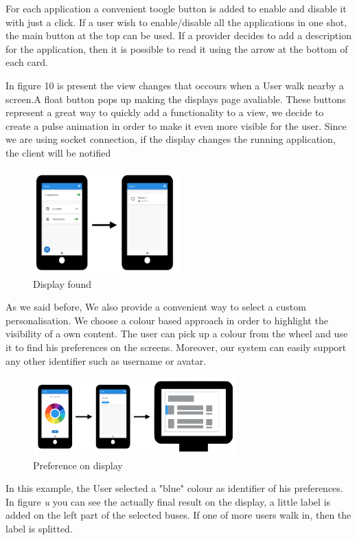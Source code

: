 \documentclass[]{usiinfbachelorproject}
\begin{document}
For each application a convenient toogle button is added to enable and disable it with just a click. If a user wish to enable/disable all the applications in one shot, the main button at the top can be used. If a provider decides to add a description for the application, then it is possible to read it using the arrow at the bottom of each card.

In figure 10 is present the view changes that occours when a User walk nearby a screen.A float button pops up making the displays page avaliable. These buttons represent a great way to quickly add a functionality to a view, we decide to create a pulse animation in order to make it even more visible for the user. Since we are using socket connection, if the display changes the running application, the client will be notified

\begin{figure}[H]
\centering
\includegraphics[width=0.5\textwidth]{./images/smartphone_displays}
\caption{Display found}
\end{figure}
As we said before, We also provide a convenient way to select a custom personalisation. We choose a colour based approach in order to highlight the visibility of a own content. The user can pick up a colour from the wheel and use it to find his preferences on the screens. Moreover, our system can easily support any other identifier such as username or avatar.
\begin{figure}[H]
  \centering
  \includegraphics[width=0.7\textwidth]{./images/smartphone_color_preference}
  \caption{Preference on display}
\end{figure}
In this example, the User selected a "blue" colour as identifier of his preferences. In figure \emph{u} you can see the actually final result on the display, a little label is added on the left part of the selected buses. If one of more users walk in, then the label is splitted.
\end{document}
